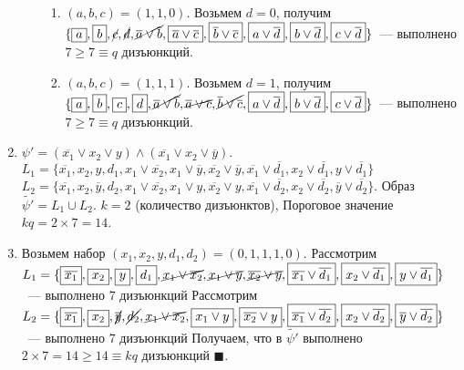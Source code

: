 \documentclass[a4paper]{article}
\begin{document}
\begin{enumerate}
\begin{enumerate}
\begin{enumerate}
\item $(a,b,c)=(1,1,0)$. Возьмем $d=0$, получим $\{\boxed{a},\boxed{b},\cancel{c},\cancel{d},\cancel{\overline{a}\vee\overline{b}},\boxed{\overline{a}\vee\overline{c}},\boxed{\overline{b}\vee\overline{c}},\boxed{a\vee\overline{d}},\boxed{b\vee\overline{d}},\boxed{c\vee\overline{d}}\}$~--- выполнено $7\geqslant 7\equiv q$ дизъюнкций.
\item $(a,b,c)=(1,1,1)$. Возьмем $d=1$, получим $\{\boxed{a},\boxed{b},\boxed{c},\boxed{d},\cancel{\overline{a}\vee\overline{b}},\cancel{\overline{a}\vee\overline{c}},\cancel{\overline{b}\vee\overline{c}},\boxed{a\vee\overline{d}},\boxed{b\vee\overline{d}},\boxed{c\vee\overline{d}}\}$~--- выполнено $7\geqslant 7\equiv q$ дизъюнкций.
\end{enumerate} 
\end{enumerate}
\item $\psi'=(\overline{x_1}\vee x_2\vee y)\wedge(\overline{x_1}\vee x_2\vee \overline{y})$.\newline $L_1=\{\overline{x_1},x_2,y,d_1,x_1\vee\overline{x_2},x_1\vee\overline{y},\overline{x_2}\vee\overline{y},\overline{x_1}\vee\overline{d_1},x_2\vee\overline{d_1},y\vee\overline{d_1}\}$\newline
$L_2=\{\overline{x_1},x_2,\overline{y},d_2,x_1\vee\overline{x_2},x_1\vee y,\overline{x_2}\vee y,\overline{x_1}\vee\overline{d_2},x_2\vee\overline{d_2},\overline{y}\vee\overline{d_2}\}$. Образ $\widetilde{\psi'}=L_1\cup L_2$. $k=2$ (количество дизъюнктов), Пороговое значение $kq=2\times 7=14$.
\item Возьмем набор $(x_1,x_2,y,d_1,d_2)=(0,1,1,1,0)$.\newline
Рассмотрим $L_1=\{\boxed{\overline{x_1}},\boxed{x_2},\boxed{y},\boxed{d_1},\cancel{x_1\vee\overline{x_2}},\cancel{x_1\vee\overline{y}},\cancel{\overline{x_2}\vee\overline{y}},\boxed{\overline{x_1}\vee\overline{d_1}},\boxed{x_2\vee\overline{d_1}},\boxed{y\vee\overline{d_1}}\}$~--- выполнено $7$ дизъюнкций\newline
Рассмотрим $L_2=\{\boxed{\overline{x_1}},\boxed{x_2},\cancel{\overline{y}},\cancel{d_2},\cancel{x_1\vee\overline{x_2}},\boxed{x_1\vee y},\boxed{\overline{x_2}\vee y},\boxed{\overline{x_1}\vee\overline{d_2}},\boxed{x_2\vee\overline{d_2}},\boxed{\overline{y}\vee\overline{d_2}}\}$~--- выполнено $7$ дизъюнкций\newline
Получаем, что в $\widetilde{\psi'}$ выполнено $2\times 7=14\geqslant 14\equiv kq$ дизъюнкций $\blacksquare$.
\end{enumerate}
\end{document}
